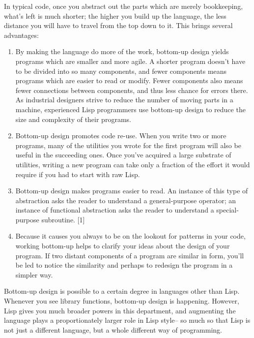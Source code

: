 In typical code, once you abstract out the parts which are merely
bookkeeping, what's left is much shorter; the higher you build up the
language, the less distance you will have to travel from the top down to
it. This brings several advantages:

\begin{enumerate}
\def\labelenumi{\arabic{enumi}.}
\item
  By making the language do more of the work, bottom-up design yields
  programs which are smaller and more agile. A shorter program doesn't
  have to be divided into so many components, and fewer components means
  programs which are easier to read or modify. Fewer components also
  means fewer connections between components, and thus less chance for
  errors there. As industrial designers strive to reduce the number of
  moving parts in a machine, experienced Lisp programmers use bottom-up
  design to reduce the size and complexity of their programs.
\item
  Bottom-up design promotes code re-use. When you write two or more
  programs, many of the utilities you wrote for the first program will
  also be useful in the succeeding ones. Once you've acquired a large
  substrate of utilities, writing a new program can take only a fraction
  of the effort it would require if you had to start with raw Lisp.
\item
  Bottom-up design makes programs easier to read. An instance of this
  type of abstraction asks the reader to understand a general-purpose
  operator; an instance of functional abstraction asks the reader to
  understand a special-purpose subroutine. {[}1{]}
\item
  Because it causes you always to be on the lookout for patterns in your
  code, working bottom-up helps to clarify your ideas about the design
  of your program. If two distant components of a program are similar in
  form, you'll be led to notice the similarity and perhaps to redesign
  the program in a simpler way.
\end{enumerate}

Bottom-up design is possible to a certain degree in languages other than
Lisp. Whenever you see library functions, bottom-up design is happening.
However, Lisp gives you much broader powers in this department, and
augmenting the language plays a proportionately larger role in Lisp
style-- so much so that Lisp is not just a different language, but a
whole different way of programming.

